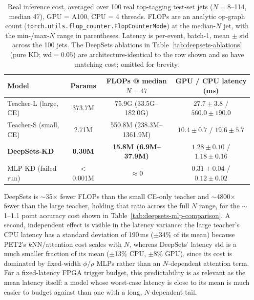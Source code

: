 \begin{table}[h]
    \centering
    \small
    \begin{tabular}{lccc}
        \toprule
        Model & Params & FLOPs @ median $N{=}47$ & GPU / CPU latency (ms) \\
        \midrule
        Teacher-L (large, CE)  & 373.7M & 75.9G (33.5G--182.0G)   & $27.7\pm3.8$ / $560.0\pm190.0$ \\
        Teacher-S (small, CE)  & 2.71M  & 550.8M (238.3M--1361.9M) & $10.4\pm0.7$ / $19.6\pm5.7$ \\
        \textbf{DeepSets-KD}   & \textbf{0.30M} & \textbf{15.8M (6.9M--37.9M)} & $\mathbf{1.28\pm0.10}$ / $\mathbf{1.18\pm0.16}$ \\
        MLP-KD (failed run)    & $<$0.001M & $\approx$0 & $0.31\pm0.04$ / $0.12\pm0.02$ \\
        \bottomrule
    \end{tabular}
    \caption{Real inference cost, averaged over 100 real top-tagging test-set
    jets ($N=8$--114, median 47), GPU = A100, CPU = 4 threads. FLOPs are an
    analytic op-graph count (\texttt{torch.utils.flop\_counter.FlopCounterMode})
    at the median-$N$ jet, with the min-/max-$N$ range in parentheses.
    Latency is per-event, batch-1, mean $\pm$ std across the 100 jets. The
    DeepSets ablations in Table~\ref{tab:deepsets-ablations} (pure KD;
    wd$=0.05$) are architecture-identical to the row shown and so have
    matching cost; omitted for brevity.}
    \label{tab:inference-cost}
\end{table}

DeepSets is $\sim$35$\times$ fewer FLOPs than the small CE-only teacher and
$\sim$4800$\times$ fewer than the large teacher, holding that ratio across
the full $N$ range, for the $\sim$1--1.1 point accuracy cost shown in
Table~\ref{tab:deepsets-mlp-comparison}. A second, independent effect is
visible in the latency variance: the large teacher's CPU latency has a
standard deviation of 190\,ms ($\pm$34\% of its mean) because PET2's
$k$NN/attention cost scales with $N$, whereas DeepSets' latency std is a
much smaller fraction of its mean ($\pm$13\% CPU, $\pm$8\% GPU), since its
cost is dominated by fixed-width $\phi$/$\rho$ MLPs rather than an
$N$-dependent attention term. For a fixed-latency FPGA trigger budget, this
predictability is as relevant as the mean latency itself: a model whose
worst-case latency is close to its mean is much easier to budget against
than one with a long, $N$-dependent tail.

